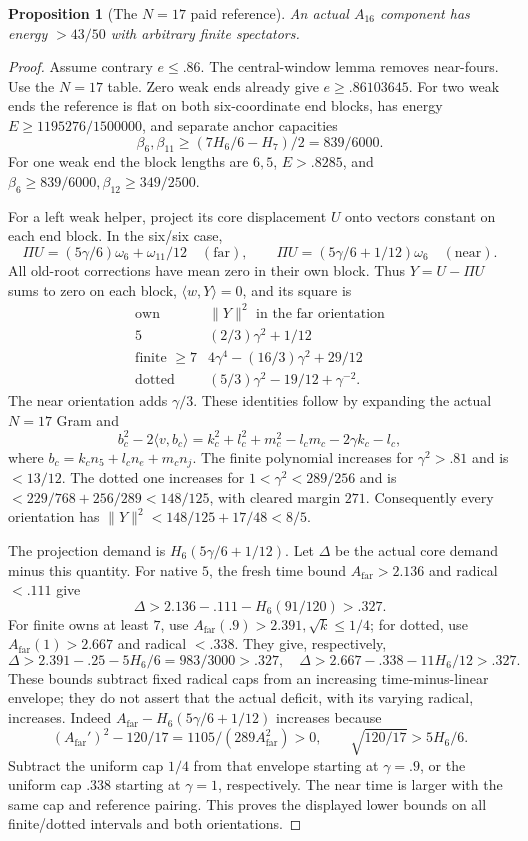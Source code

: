 \documentclass[11pt]{article}
\newtheorem{proposition}[theorem]{Proposition}
\theoremstyle{definition}
\theoremstyle{remark}
\newcommand{\ip}[2]{\langle #1,#2\rangle}
\newcommand{\norm}[1]{\lVert #1\rVert}
\begin{document}
\begin{proposition}[The \(N=17\) paid reference]
\label{app:prop:A16}
An actual \(A_{16}\) component has energy \(>43/50\)
with arbitrary finite spectators.
\end{proposition}
\begin{proof}
Assume contrary \(e\leq.86\). The central-window
lemma removes near-fours. Use the \(N=17\) table.
Zero weak ends already give \(e\geq.86103645\).
For two weak ends the reference is flat on both
six-coordinate end blocks, has energy
\(E\geq1195276/1500000\), and separate anchor capacities
\[
 \beta_6,\beta_{11}\geq
 (7H_6/6-H_7)/2=839/6000.
\]
For one weak end the block lengths are \(6,5\),
\(E>.8285\), and
\(\beta_6\geq839/6000,\beta_{12}\geq349/2500\).

For a left weak helper, project its core displacement
\(U\) onto vectors constant on each end block.
In the six/six case,
\[
 \Pi U=(5\gamma/6)\omega_6+\omega_{11}/12
       \quad(\text{far}),\qquad
 \Pi U=(5\gamma/6+1/12)\omega_6
       \quad(\text{near}).
\]
All old-root corrections have mean zero in their
own block. Thus \(Y=U-\Pi U\) sums to zero on each
block, \(\ip{w}{Y}=0\), and its square is
\[
\begin{array}{c|c}
\text{own}&\norm{Y}^2\text{ in the far orientation}\\ \hline
5&(2/3)\gamma^2+1/12\\
\text{finite }\geq7&4\gamma^4-(16/3)\gamma^2+29/12\\
\text{dotted}&(5/3)\gamma^2-19/12+\gamma^{-2}.
\end{array}
\]
The near orientation adds \(\gamma/3\).
These identities follow by expanding the actual
\(N=17\) Gram and
\[
 b_c^2-2\ip{v}{b_c}
 =k_c^2+l_c^2+m_c^2-l_cm_c-2\gamma k_c-l_c,
\]
where \(b_c=k_cn_5+l_cn_e+m_cn_j\).
The finite polynomial increases for \(\gamma^2>.81\)
and is \(<13/12\). The dotted one increases for
\(1<\gamma^2<289/256\) and is
\(<229/768+256/289<148/125\), with cleared margin \(271\).
Consequently every orientation has
\(\norm{Y}^2<148/125+17/48<8/5\).

The projection demand is \(H_6(5\gamma/6+1/12)\).
Let \(\Delta\) be the actual core demand minus this
quantity. For native \(5\), the fresh time bound
\(A_{\mathrm{far}}>2.136\) and radical \(<.111\)
give
\[
 \Delta>2.136-.111-H_6(91/120)>.327.
\]
For finite owns at least \(7\), use
\(A_{\mathrm{far}}(.9)>2.391,\sqrt k\leq1/4\);
for dotted, use \(A_{\mathrm{far}}(1)>2.667\)
and radical \(<.338\). They give, respectively,
\[
 \Delta>2.391-.25-5H_6/6=983/3000>.327,
 \quad
 \Delta>2.667-.338-11H_6/12>.327.
\]
These bounds subtract fixed radical caps from an increasing
time-minus-linear envelope; they do not assert that the actual
deficit, with its varying radical, increases. Indeed
\(A_{\mathrm{far}}-H_6(5\gamma/6+1/12)\) increases because
\[
 (A_{\mathrm{far}}')^2-120/17
       =1105/(289A_{\mathrm{far}}^2)>0,\qquad
 \sqrt{120/17}>5H_6/6.
\]
Subtract the uniform cap \(1/4\) from that envelope starting
at \(\gamma=.9\), or the uniform cap \(.338\) starting at
\(\gamma=1\), respectively. The near time is larger with
the same cap and reference pairing. This proves the displayed
lower bounds on all finite/dotted intervals and both orientations.


\end{proof}
\end{document}
